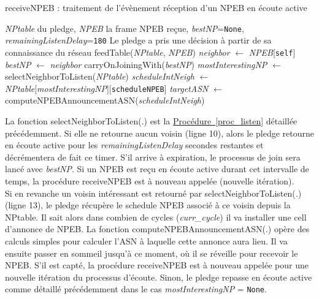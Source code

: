 \documentclass[]{report}
\newcommand{\wordlink}[2]{\hyperref[#2]{#1~\ref{#2}}}
\begin{document}
\begin{algorithm}[!h]
\caption{receiveNPEB : traitement de l'évènement réception d'un NPEB en écoute active}
\begin{algorithmic}[1]
\Require \textit{NPtable} du pledge, \textit{NPEB} la frame NPEB reçue, \textit{bestNP}=\texttt{None}, \textit{remainingListenDelay}=\texttt{180}
\Ensure Le pledge a pris une décision à partir de sa connaissance du réseau
\State feedTable(\textit{NPtable}, \textit{NPEB})
\State \textit{neighbor} $\leftarrow$ \textit{NPEB}[\texttt{self}]
\State \textit{bestNP} $\leftarrow$ \textit{neighbor}
\EndIf
{}
\State carryOnJoiningWith(\textit{bestNP})
\Else
\State \textit{mostInterestingNP} $\leftarrow$ selectNeighborToListen(\textit{NPtable})
\Else
\State \textit{scheduleIntNeigh} $\leftarrow$ \textit{NPtable}[\textit{mostInterestingNP}][\texttt{scheduleNPEB}]
\State \textit{targetASN} $\leftarrow$ computeNPEBAnnouncementASN(\textit{scheduleIntNeigh})
\EndIf
\EndIf
\end{algorithmic}
\label{proc_iter}
\end{algorithm}

\vspace{0.2cm}


La fonction selectNeighborToListen(.) est la \wordlink{Procédure}{proc_listen} détaillée précédemment. Si elle ne retourne aucun voisin (ligne 10), alors le pledge retourne en écoute active pour les \textit{remainingListenDelay} secondes restantes et décrémentera de fait ce timer. S'il arrive à expiration, le processus de join sera lancé avec \textit{bestNP}. Si un NPEB est reçu en écoute active durant cet intervalle de temps, la procédure receiveNPEB est à nouveau appelée (nouvelle itération).\\

Si en revanche un voisin intéressant est retourné par selectNeighborToListen(.) (ligne 13), le pledge récupère le schedule NPEB associé à ce voisin depuis la NPtable. Il sait alors dans combien de cycles (\textit{curr\_cycle}) il va installer une cell d'annonce de NPEB. La fonction computeNPEBAnnouncementASN(.) opère des calculs simples pour calculer l'ASN à laquelle cette annonce aura lieu. Il va ensuite passer en sommeil jusqu'à ce moment, où il se réveille pour recevoir le NPEB. S'il est capté, la procédure receiveNPEB est à nouveau appelée pour une nouvelle itération du processus d'écoute. Sinon, le pledge repasse en écoute active comme détaillé précédemment dans le cas \textit{mostInterestingNP} = \texttt{None}.\\
\end{document}
